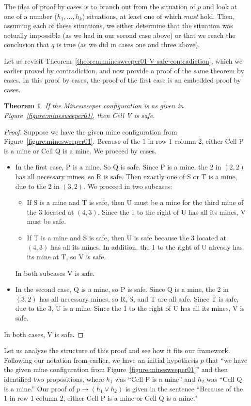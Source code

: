 \documentclass{book}
\newcounter{ekcounter}%
\theoremstyle{ekimcustom}
\newtheorem{theorem}[ekcounter]{Theorem}
\begin{document}
The idea of proof by cases is to branch out from the situation of $p$ and look at one of a number ($h_1,\dots,h_k$) situations, at least one of which \emph{must} hold. Then, assuming each of these situations, we either determine that the situation was actually impossible (as we had in our second case above) or that we reach the conclusion that $q$ is true (as we did in cases one and three above).

Let us revisit Theorem~\ref{theorem:minesweeper01-V-safe-contradiction}, which we earlier proved by contradiction, and now provide a proof of the same theorem by cases. In this proof by cases, the proof of the first case is an embedded proof by cases.
\begin{theorem}
If the Minesweeper configuration is as given in Figure~\ref{figure:minesweeper01}, then Cell V is safe.
\end{theorem}
\begin{proof}
Suppose we have the given mine configuration from Figure~\ref{figure:minesweeper01}.
Because of the $1$ in row $1$ column $2$, either Cell P is a mine or Cell Q is a mine. We proceed by cases.
\begin{itemize}
\item In the first case, P is a mine. So Q is safe. Since P is a mine, the 2 in $(2,2)$ has all necessary mines, so R is safe. Then exactly one of S or T is a mine, due to the 2 in $(3,2)$. We proceed in two subcases:
\begin{itemize}
\item If S is a mine and T is safe, then U must be a mine for the third mine of the 3 located at $(4,3)$. Since the 1 to the right of U has all its mines, V must be safe.
\item If T is a mine and S is safe, then U is safe because the 3 located at $(4,3)$ has all its mines.  In addition, the 1 to the right of U already has its mine at T, so V is safe.
\end{itemize}
In both subcases V is safe.
\item In the second case, Q is a mine, so P is safe. Since Q is a mine, the 2 in $(3,2)$ has all necessary mines, so R, S, and T are all safe. Since T is safe, due to the 3, U is a mine. Since the 1 to the right of U has all its mines, V is safe.
\end{itemize}
In both cases, V is safe.
\end{proof}
Let us analyze the structure of this proof and see how it fits our framework. Following our notation from earlier, we have an initial hypothesis $p$ that ``we have the given mine configuration from Figure~\ref{figure:minesweeper01}'' and then identified two propositions, where $h_1$ was ``Cell P is a mine'' and $h_2$ was ``Cell Q is a mine.'' Our proof of $p \rightarrow (h_1 \vee h_2)$ is given in the sentence ``Because of the $1$ in row $1$ column $2$, either Cell P is a mine or Cell Q is a mine.''
\end{document}
